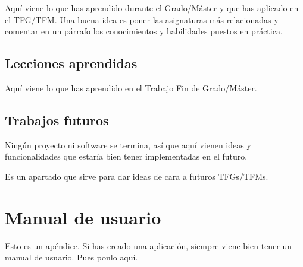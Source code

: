 \documentclass[a4paper, 12pt]{book}
\begin{document}
Aquí viene lo que has aprendido durante el Grado/Máster y que has aplicado en el TFG/TFM.
Una buena idea es poner las asignaturas más relacionadas y comentar en un párrafo los conocimientos y habilidades puestos en práctica.


\section{Lecciones aprendidas}
\label{sec:lecciones_aprendidas}

Aquí viene lo que has aprendido en el Trabajo Fin de Grado/Máster.


\section{Trabajos futuros}
\label{sec:trabajos_futuros}

Ningún proyecto ni software se termina, así que aquí vienen ideas y funcionalidades que estaría bien tener implementadas en el futuro.

Es un apartado que sirve para dar ideas de cara a futuros TFGs/TFMs.



\cleardoublepage
\appendix
\chapter{Manual de usuario}
\label{app:manual}

Esto es un apéndice.
Si has creado una aplicación, siempre viene bien tener un manual de usuario.
Pues ponlo aquí.


\cleardoublepage


\end{document}
